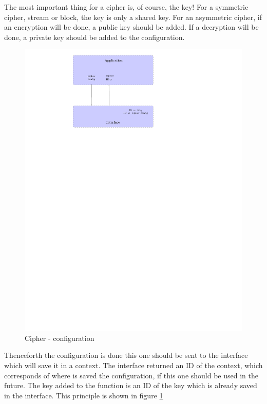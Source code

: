 The most important thing for a cipher is, of course, the key!\newline
For a symmetric cipher, stream or block, the key is only a shared key.\newline
For an asymmetric cipher, if an encryption will be done, a public key should
be added. If a decryption will be done, a private key should be added to the
configuration.
\begin{figure}[!ht]
\centering
\includegraphics[trim=8.5cm 20cm 9.5cm 0cm]{figures/cipher_example_config.pdf}
\caption{Cipher - configuration\newline}
\label{fig:gci_cipher_config}
\end{figure}
Thenceforth the configuration is done this one should be sent to the interface
which will save it in a context.\newline
The interface returned an ID of the context, which corresponds of where is saved
the configuration, if this one should be used in the future.\newline
The key added to the function is an ID of the key which is already saved in
the interface.\newline
This principle is shown in figure \ref{fig:gci_cipher_config}

